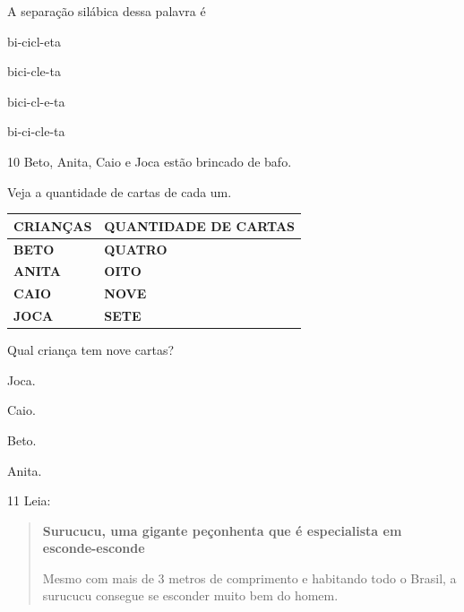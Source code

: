 
A separação silábica dessa palavra é

\begin{escolha}
\item bi-cicl-eta

\item bici-cle-ta

\item bici-cl-e-ta

\item bi-ci-cle-ta
\end{escolha}

\num{10} Beto, Anita, Caio e Joca estão brincado de bafo.

Veja a quantidade de cartas de cada um.

\begin{longtable}[]{@{}ll@{}}
\toprule
\textbf{CRIANÇAS} & \textbf{QUANTIDADE DE CARTAS}\tabularnewline
\midrule
\endhead
\textbf{BETO} & \textbf{QUATRO}\tabularnewline
\textbf{ANITA} & \textbf{OITO}\tabularnewline
\textbf{CAIO} & \textbf{NOVE}\tabularnewline
\textbf{JOCA} & \textbf{SETE}\tabularnewline
\bottomrule
\end{longtable}

Qual criança tem nove cartas?

\begin{escolha}
\item Joca.

\item Caio.

\item Beto.

\item Anita.
\end{escolha}

\num{11} Leia:

\begin{quote}
\textbf{Surucucu, uma gigante peçonhenta que é especialista em esconde-esconde}

Mesmo com mais de 3 metros de comprimento e habitando todo o Brasil, a
surucucu consegue se esconder muito bem do homem.
\end{quote}


